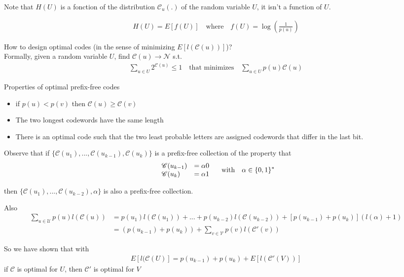 \documentclass{article}
\theoremstyle{definition} %
\def\V{\mathcal{V}}
\def\U{\mathcal{U}}
\def\N{\mathcal{N}}
\def\C{\mathscr{C}}
\begin{document}
Note that $H(U)$ is a fonction of the distribution $\C_u(.)$ of the random variable $U$, it isn't a function of $U$.

\begin{align*}
  H(U) = E[f(U)] \quad \text{where} \quad f(U) = \log(\frac{1}{p(u)})
\end{align*}

How to design optimal codes (in the sense of minimizing $E[l(\C(u))]$)? \\
Formally, given a random variable $U$, find $\C(u) \rightarrow \N$ s.t.
\begin{align*}
  \sum_{u \in U} 2^{\C(u)} \leq 1
\quad \text{that minimizes} \quad
  \sum_{u \in U} p(u)\C(u)
\end{align*}

Properties of optimal prefix-free codes
\begin{itemize}
  \item if $p(u) < p(v)$ then $\C(u) \geq \C(v)$
  \item The two longest codewords have the same length
  \item There is an optimal code such that the two least probable letters are assigned codewords that differ in the last bit.
\end{itemize}

Observe that if $\{\C(u_1), ... , \C(u_{k-1}), \C(u_k)\}$ is a prefix-free collection of the property that
\begin{align*}
\left.
\begin{array}{l l}
  \C(u_{k-1}) &= \alpha 0 \\
  \C(u_k)     &= \alpha 1
\end{array}
\right.
\quad \text{with} \quad \alpha \in \{ 0, 1\}^*
\end{align*}

then $\{\C(u_1), ..., \C(u_{k-2}), \alpha\}$ is also a prefix-free collection.

Also
\begin{align*}
  \sum_{u \in \U} p(u) l(\C(u)) &= p(u_1) l(\C(u_1)) + ... +  p(u_{k-2}) l(\C(u_{k-2}))
  + [p(u_{k-1}) + p(u_k)](l(\alpha) + 1) \\
  &= (p(u_{k-1}) + p(u_k)) + \sum_{v \in \V} p(v) l(\C'(v))
\end{align*}

So we have shown that with
\begin{align*}
  E[l(\C(U)] = p(u_{k-1}) + p(u_k) + E[l(\C'(V))]
\end{align*}
if $\C$ is optimal for $U$, then $\C'$ is optimal for $V$
\end{document}
